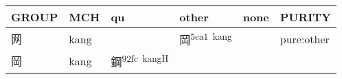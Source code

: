 \documentclass[14pt,a4paper]{scrartcl}
\begin{document}
\begin{longtable}[c]{@{}llllll@{}}
\toprule
\begin{minipage}[b]{0.14\columnwidth}\raggedright\strut
GROUP
\strut\end{minipage} &
\begin{minipage}[b]{0.14\columnwidth}\raggedright\strut
MCH
\strut\end{minipage} &
\begin{minipage}[b]{0.14\columnwidth}\raggedright\strut
qu
\strut\end{minipage} &
\begin{minipage}[b]{0.14\columnwidth}\raggedright\strut
other
\strut\end{minipage} &
\begin{minipage}[b]{0.14\columnwidth}\raggedright\strut
none
\strut\end{minipage} &
\begin{minipage}[b]{0.14\columnwidth}\raggedright\strut
PURITY
\strut\end{minipage}\tabularnewline
\midrule
\endhead
\begin{minipage}[t]{0.14\columnwidth}\raggedright\strut
网
\strut\end{minipage} &
\begin{minipage}[t]{0.14\columnwidth}\raggedright\strut
kang
\strut\end{minipage} &
\begin{minipage}[t]{0.14\columnwidth}\raggedright\strut
\strut\end{minipage} &
\begin{minipage}[t]{0.14\columnwidth}\raggedright\strut
岡\textsuperscript{5ca1~kang}
\strut\end{minipage} &
\begin{minipage}[t]{0.14\columnwidth}\raggedright\strut
\strut\end{minipage} &
\begin{minipage}[t]{0.14\columnwidth}\raggedright\strut
pure:other
\strut\end{minipage}\tabularnewline
\begin{minipage}[t]{0.14\columnwidth}\raggedright\strut
岡
\strut\end{minipage} &
\begin{minipage}[t]{0.14\columnwidth}\raggedright\strut
kang
\strut\end{minipage} &
\begin{minipage}[t]{0.14\columnwidth}\raggedright\strut
鋼\textsuperscript{92fc~kangH}
\strut\end{minipage} &

\end{longtable}
\end{document}
